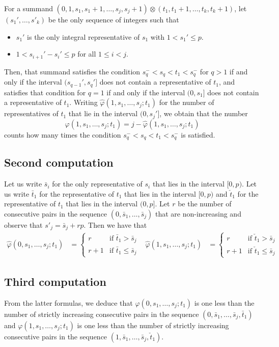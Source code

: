 For a summand $(0,1,s_1,s_1+1,\ldots,s_j,s_j+1)\otimes (t_1,t_1+1,\ldots,t_k,t_k+1)$, let $(s_1',\ldots,s'_k)$ be the only sequence of integers such that
\begin{itemize}
	\item $s_1'$ is the only integral representative of $s_1$ with $1< s_1'\leq p$.
	\item $1<s_{i+1}'-s_i'\leq p$ for all $1\leq i<j$.
\end{itemize}
Then, that summand satisfies the condition $s_q^-<s_q<t_1<s_q^-$ for $q>1$ if and only if the interval $(s_{q-1}',s_q']$ does not contain a representative of $t_1$, and satisfies that condition for $q=1$ if and only if the interval $(0,s_1]$ does not contain a representative of $t_1$. Writing $\hat{\varphi}(1,s_1,\ldots,s_j;t_1)$ for the number of representatives of $t_1$ that lie in the interval $(0,s_j']$, we obtain that the number
\[\varphi(1,s_1,\ldots,s_j;t_1) = j-\hat{\varphi}(1,s_1,\ldots,s_j;t_1)\]
counts how many times the condition $s_q^-<s_q<t_1<s_q^-$ is satisfied.

\subsection*{Second computation} Let us write $\bar{s}_i$ for the only representative of $s_i$ that lies in the interval $[0,p)$. Let us write $\bar{t}_1$ for the representative of $t_1$ that lies in the interval $[0,p)$ and $\check{t}_1$ for the representative of $t_1$ that lies in the interval $(0,p]$. Let $r$ be the number of consecutive pairs in the sequence $(0,\bar{s}_1,\ldots,\bar{s}_j)$ that are non-increasing and observe that $s'_j = \bar{s}_j + rp$. Then we have that
\begin{align*}
	\hat{\varphi}(0,s_1,\ldots,s_j;t_1) &= \begin{cases}
		r & \text{if $\bar{t}_1>\bar{s}_j$} \\
		r+1 & \text{if $\bar{t}_1\leq \bar{s}_j$}
	\end{cases}
	&
	\hat{\varphi}(1,s_1,\ldots,s_j;t_1) &= \begin{cases}
		r & \text{if $\check{t}_1>\bar{s}_j$} \\
		r+1 & \text{if $\check{t}_1\leq \bar{s}_j$}
	\end{cases}
\end{align*}

\subsection*{Third computation} From the latter formulas, we deduce that $\varphi(0,s_1,\ldots,s_j;t_1)$ is one less than the number of strictly increasing consecutive pairs in the sequence $(0,\bar{s}_1,\ldots,\bar{s}_j,\bar{t}_1)$ and $\varphi(1,s_1,\ldots,s_j;t_1)$ is one less than the number of strictly increasing consecutive pairs in the sequence $(1,\bar{s}_1,\ldots,\bar{s}_j,\check{t}_1)$.

